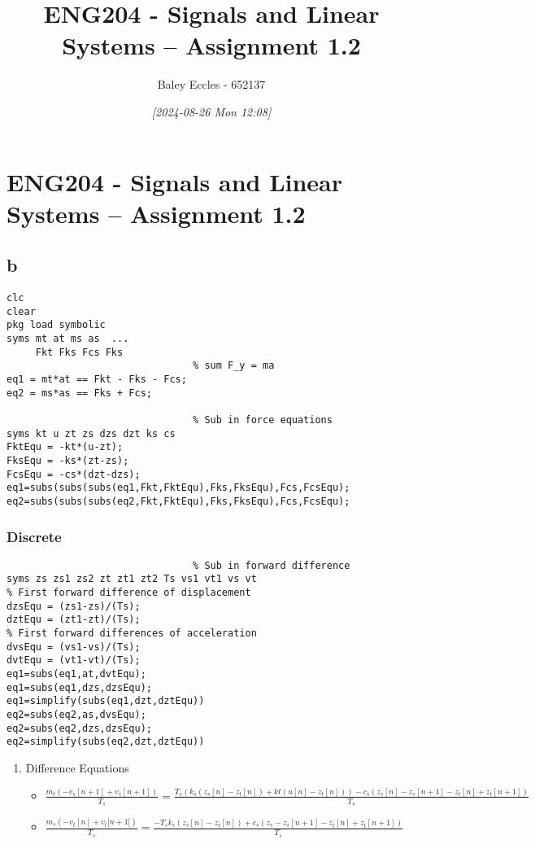 \documentclass[11pt]{article}
\author{Baley Eccles - 652137}
\date{\textit{{[}2024-08-26 Mon 12:08]}}
\title{ENG204 - Signals and Linear Systems – Assignment 1.2}
\begin{document}
\maketitle
\tableofcontents

\section{ENG204 - Signals and Linear Systems – Assignment 1.2}
\label{sec:org7409fdb}
\subsection{b}
\label{sec:orgf62f837}
\begin{verbatim}
clc
clear
pkg load symbolic
syms mt at ms as  ...
     Fkt Fks Fcs Fks
                                % sum F_y = ma
eq1 = mt*at == Fkt - Fks - Fcs;
eq2 = ms*as == Fks + Fcs;

                                % Sub in force equations
syms kt u zt zs dzs dzt ks cs
FktEqu = -kt*(u-zt);
FksEqu = -ks*(zt-zs);
FcsEqu = -cs*(dzt-dzs);
eq1=subs(subs(subs(eq1,Fkt,FktEqu),Fks,FksEqu),Fcs,FcsEqu);
eq2=subs(subs(subs(eq2,Fkt,FktEqu),Fks,FksEqu),Fcs,FcsEqu);
\end{verbatim}
\subsubsection{Discrete}
\label{sec:org6520ed6}
\begin{verbatim}
                                % Sub in forward difference
syms zs zs1 zs2 zt zt1 zt2 Ts vs1 vt1 vs vt
% First forward difference of displacement
dzsEqu = (zs1-zs)/(Ts);
dztEqu = (zt1-zt)/(Ts);
% First forward differences of acceleration
dvsEqu = (vs1-vs)/(Ts);
dvtEqu = (vt1-vt)/(Ts);
eq1=subs(eq1,at,dvtEqu);
eq1=subs(eq1,dzs,dzsEqu);
eq1=simplify(subs(eq1,dzt,dztEqu))
eq2=subs(eq2,as,dvsEqu);
eq2=subs(eq2,dzs,dzsEqu);
eq2=simplify(subs(eq2,dzt,dztEqu))

\end{verbatim}
\begin{enumerate}
\item Difference Equations
\label{sec:org53c5338}
\begin{itemize}
\item \(\frac{m_t \left(- v_s[n+1] + v_s[n+1]\right)}{T_s} = \frac{T_s \left(k_s \left(z_s[n] - z_t[n]\right) + kt \left(u[n] - z_t[n]\right)\right) - c_s \left(z_s[n] - z_s[n+1] - z_t[n] + z_t[n+1]\right)}{T_s}\)
\item \(\frac{m_s \left(- v_t[n] + v_t[n+1[\right)}{T_s} = \frac{- T_s k_s \left(z_s[n] - z_t[n]\right) + c_s \left(z_s - z_s[n+1] - z_t[n] + z_t[n+1]\right)}{T_s}\)
\end{itemize}
\end{enumerate}
\end{document}
